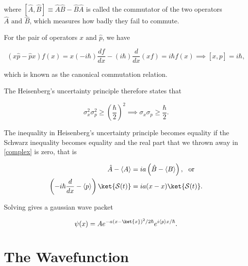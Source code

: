 \documentclass[a4paper,12pt]{report}
\begin{document}
where \(\left[ \hat{A} , \hat{B}  \right] \equiv \hat{A} \hat{B} - \hat{B} \hat{A} \) is called the commutator of the two operators \(\hat{A} \text { and } \hat{B} \), which measures how badly they fail to commute.  

For the pair of operators \(x \text { and } \hat{p} \), we have

\begin{equation}
  (x \hat{p} - \hat{p} x )f(x) = x(-i \hbar )\frac{df}{dx} -(i \hbar )\frac{d}{dx}(xf) = i \hbar f(x) \implies \left[ x, \hat{p}  \right] = i \hbar ,
\end{equation}

which is known as the canonical commutation relation. 

The Heisenberg's uncertainty principle therefore states that 

\begin{equation}
  \sigma _{x}^2\sigma _{p}^2 \ge \left( \frac{\hbar }{2}  \right)^2 \implies \sigma _{x}\sigma _{p} \ge \frac{\hbar }{2}.   
\end{equation}

The inequality in Heisenberg's uncertainty principle becomes equality if the Schwarz inequality becomes equality and the real part that we thrown away in \cref{complex} is zero, that is

\begin{equation}
  \begin{aligned} 
  \hat{A} - \left \langle {A} \right \rangle &= ia \left( \hat{B} - \left \langle {B} \right \rangle  \right), ~\text { or }~ \\
  \left( -i \hbar \frac{d}{dx} - \left \langle {p} \right \rangle   \right) \ket{\mathcal{S}(t)} &= ia (x - x) \ket{\mathcal{S}(t)}.
  \end{aligned}  
\end{equation}

Solving gives a gaussian wave packet 

\begin{equation}
  \psi (x) = Ae^{-a (x - \ket{x} )^2 / 2 \hbar } e^{i \left \langle {p} \right \rangle x /\hbar }.  
\end{equation}













\chapter{The Wavefunction}
	
\end{document}
